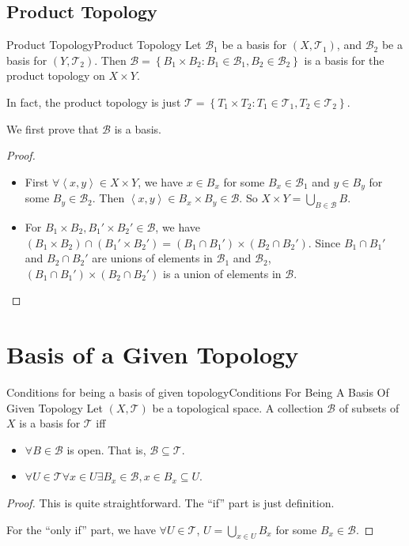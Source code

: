\documentclass[../main.tex]{subfiles}
\begin{document}
\subsection{Product Topology}
\begin{definition}{Product Topology}{Product Topology}
	Let $\mathcal{B}_1$ be a basis for $(X,\mathcal{T}_1)$, and $\mathcal{B}_2$ be a basis for $(Y,\mathcal{T}_2)$. Then $\mathcal{B} = \left\{ B_1 \times B_2 : B_1\in \mathcal{B}_1, B_2\in \mathcal{B}_2 \right\}$ is a basis for the product topology on $X\times Y$.

	In fact, the product topology is just $\mathcal{T} = \left\{ T_1 \times T_2 : T_1\in \mathcal{T}_1, T_2 \in \mathcal{T}_2\right\}$.
\end{definition}
We first prove that $\mathcal{B}$ is a basis.
\begin{proof}
\begin{itemize}
	\item First $\forall \left<x,y\right>\in X \times Y$, we have $x\in B_x$ for some $B_x\in \mathcal{B}_1$ and $y\in B_y$ for some $B_y\in \mathcal{B}_2$. Then $\left<x,y\right>\in B_x\times B_y\in \mathcal{B}$. So $X \times Y = \bigcup_{B\in \mathcal{B}} B$.
	\item For $B_1\times B_2, B_1'\times B_2'\in \mathcal{B}$, we have $(B_1\times B_2)\cap (B_1'\times B_2') = (B_1\cap B_1')\times (B_2\cap B_2')$. Since $B_1\cap B_1'$ and $B_2\cap B_2'$ are unions of elements in $\mathcal{B}_1$ and $\mathcal{B}_2$, $(B_1\cap B_1')\times (B_2\cap B_2')$ is a union of elements in $\mathcal{B}$.
\end{itemize}
\end{proof}


\section{Basis of a Given Topology}

\begin{theorem}{Conditions for being a basis of given topology}{Conditions For Being A Basis Of Given Topology}
	Let $(X,\mathcal{T})$ be a topological space. A collection $\mathcal{B}$ of subsets of $X$ is a basis for $\mathcal{T}$ iff
	\begin{itemize}
	\item $\forall B\in \mathcal{B}$ is open. That is, $\mathcal{B} \subseteq \mathcal{T}$.
	\item $\forall U \in \mathcal{T} \forall x\in U \exists B_x\in \mathcal{B},x\in B_x \subseteq U$.
	\end{itemize}
\end{theorem}
\begin{proof}
	This is quite straightforward. The ``if'' part is just definition. 

	For the ``only if'' part, we have $\forall U\in \mathcal{T}$, $U = \bigcup_{x\in U} B_x$ for some $B_x\in \mathcal{B}$.
\end{proof}
\end{document}
